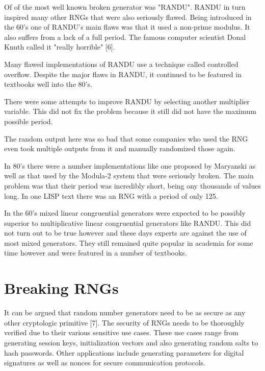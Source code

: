 \documentclass{article}
\begin{document}
    Of of the most well known broken generator was "RANDU". RANDU in turn
    inspired many other RNGs that were also seriously flawed.
    Being introduced in the 60's one of RANDU's main flaws
    was that it used a non-prime modulus. It also suffers from a lack
    of a full period. The famous computer scientist Donal Knuth called it "really horrible" [6].

    Many flawed implementations of RANDU use a technique called controlled overflow.
    Despite the major flaws in RANDU, it continued to be featured in textbooks well
    into the 80's.

    There were some attempts to improve RANDU by selecting another multiplier variable.
    This did not fix the problem because it still did not have the maximum possible period.

    The random output here was so bad that some companies who used the RNG even
    took multiple outputs from it and manually randomized those again.

    In 80's there were a number implementations like one proposed by Maryanski as well
    as that used by the Modula-2 system that were seriously broken.
    The main problem was that their period was incredibly short, being ony thousands
    of values long. In one LISP text there was an RNG with a period of only 125.

    In the 60's mixed linear congruential generators were expected to be possibly
    superior to multiplicative linear congruential generators like RANDU.
    This did not turn out to be true however and these days experts are against the
    use of most mixed generators.
    They still remained quite popular in academia for some time however and were
    featured in a number of textbooks.
    
    \section{Breaking RNGs}

    It can be argued that random number generators need to be as secure
    as any other cryptologic primitive [7].
    The security of RNGs needs to be thoroughly verified due to their
    various sensitive use cases.
    These use cases range from generating session keys, initialization vectors and
    also generating random salts to hash passwords.
    Other applications include generating parameters for digital signatures
    as well as nonces for secure communication protocols.
\end{document}
